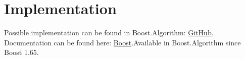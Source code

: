 \documentclass{wg21}
\begin{document}
\section{Implementation}
Possible implementation can be found in Boost.Algorithm: \href{https://github.com/boostorg/algorithm/blob/develop/include/boost/algorithm/is_partitioned_until.hpp}{GitHub}. Documentation can be found here: \href{https://www.boost.org/doc/libs/1_70_0/libs/algorithm/doc/html/the_boost_algorithm_library/Misc/is_partitioned_until.html}{Boost}.Available in Boost.Algorithm since Boost 1.65.
\end{document}
